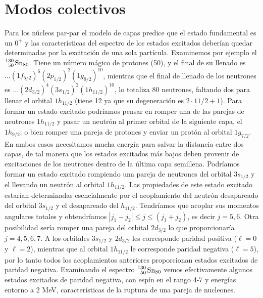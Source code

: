 \section{Modos colectivos}

Para los núcleos par-par el modelo de capas predice que el estado fundamental es un $0^+$ y las características del espectro de los estados excitados deberían quedar determinadas por la excitación de una sola partícula. Examinemos por ejemplo el $\ce{^130_50 Sn_80}$. Tiene un número mágico de protones (50), y el final de su llenado es $\ldots(1f_{5/2})^6 (2p_{1/2})^2 (1g_{9/2})^{10}$, mientras que el final de llenado de los neutrones es $\ldots(2d_{3/2})^4(3s_{1/2})^2(1h_{11/2})^10$, lo totaliza 80 neutrones, faltando dos para llenar el orbital $1h_{11/2}$ (tiene 12 ya que su degeneración es $2\cdot 11/2+1$). Para formar un estado excitado podríamos pensar en romper una de las parejas de neutrones $1h_{11/2}$ y pasar un neutrón al primer orbital de la siguiente capa, el $1h_{9/2}$; o bien romper una pareja de protones y enviar un protón al orbital $1g_{7/2}$. En ambos casos necesitamos mucha energía para salvar la distancia entre dos capas, de tal manera que los estados excitados más bajos deben provenir de excitaciones de los neutrones dentro de la última capa semillena. Podríamos formar un estado excitado rompiendo una pareja de neutrones del orbital $3s_{1/2}$ y el llevando un neutrón al orbital $1h_{11/2}$. Las propiedades de este estado excitado estarían determinadas esencialmente por el acoplamiento del neutrón desapareado del orbital $3s_{1/2}$ y el desapareado del $h_{11/2}$. Tendríamos que acoplar sus momentos angulares totales y obtendríamos $|j_1-j_2|\leq j \leq (j_1+j_2)$, es decir $j=5,6$. Otra posibilidad sería romper una pareja del orbital $2d_{3/2}$ lo que proporcionaría $j=4,5,6,7$. A los orbitales $3s_{1/2}$ y $2d_{3/2}$ les corresponde paridad positiva ($\ell = 0$ y $\ell = 2$), mientras que al orbital $1h_{11/2}$ le corresponde paridad negativa ($\ell = 5$), por lo tanto todos los acoplamientos anteriores proporcionan estados excitados de paridad negativa. Examinando el espectro $\ce{^{130}_{50} Sn_80}$ vemos efectivamente algunos estados excitados de paridad negativa, con espín en el rango 4-7 y energías entorno a 2 MeV, características de la ruptura de una pareja de nucleones. 

